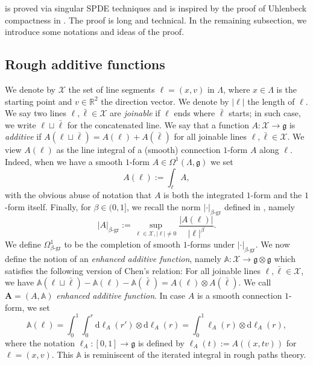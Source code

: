 \documentclass[12pt]{article}
\numberwithin{equation}{section}
\theoremstyle{definition}
\theoremstyle{remark}
\newcommand{\diff}{\mathrm{d}}
\newcommand{\R}{\mathbb R}
\newcommand{\1}{\mathbf 1}
\newcommand{\<}{\langle}
\renewcommand{\>}{\rangle}
\newcommand{\gr}{\text{-}\mathrm{gr}}
\newcommand{\bfA}{\mathbf A}
\newcommand{\bA}{\mathbb A}
\newcommand{\cX}{\mathcal X}
\newcommand{\fg}{\mathfrak g}
\begin{document}
  is proved via singular SPDE techniques and is inspired by the proof of Uhlenbeck compactness in \cite{Uhlenbeck82}. The proof is long and technical. In the remaining subsection, we introduce some notations and ideas of the proof.   
\subsection{Rough additive functions}\label{sec:RAF}

%
%
We denote by $\cX$ the set of line segments $\ell=(x,v)$ in $\Lambda$, where $x\in\Lambda$ is the starting point and $v\in\R^2$ the direction vector. We denote by $|\ell|$ the length of $\ell$. 
%
We say two lines $\ell,\bar\ell\in\cX$ are \emph{joinable} if $\ell$ ends where $\bar\ell$ starts; in such case, we write $\ell\sqcup\bar\ell$ for the concatenated line. We say that a function $A:\cX\to \fg$ is \emph{additive} if $A(\ell\sqcup\bar\ell)=A(\ell)+A(\bar\ell)$ for all joinable lines $\ell,\bar\ell\in\cX$.  
%
We view $A(\ell)$ as the line integral of a (smooth) connection $1$-form $A $ along $\ell$. Indeed, when we have a smooth $1$-form $A\in\Omega^1 (\Lambda,\fg)$ we set
\[
A(\ell):=\int_\ell A,
\]
with the obvious abuse of notation that $A$ is both the integrated $1$-form and the $1$-form itself. 
%
Finally, for $\beta\in (0,1]$, we recall the norm $|\cdot|_{\beta\gr}$ defined in \cite{CCHS2d}, namely 
\[
|A|_{\beta\gr}:=\sup_{\ell\in\cX,|\ell|\neq 0}\frac{|A(\ell)|}{|\ell|^\beta}.
\]
We define $\Omega^1_{\beta\gr}$ to be the completion of smooth $1$-forms under $|\cdot|_{\beta\gr}$.
%
We now define the notion of an \emph{enhanced additive function}, namely 
%
 $\bA:\cX\to \fg\otimes \fg$ which satisfies the following version of Chen's relation: 
%
For all joinable lines $\ell,\bar\ell\in\cX$, we have $\bA(\ell\sqcup \bar\ell)-\bA(\ell)-\bA(\bar\ell)=A(\ell)\otimes A(\bar \ell)$.
We call $\bfA=(A,\bA)$ \emph{enhanced additive function}.  In case $A$ is a smooth connection $1$-form, we set
%
$$\bA(\ell)=\int^1_0\int^r_0 \diff\ell_A(r') \otimes\diff\ell_A(r)=\int^1_0\ell_A(r)\otimes\diff\ell_A(r),$$
%
where the notation $\ell_A:[0,1]\to\fg$ is defined by $\ell_A(t):=A((x,tv))$ for $\ell=(x,v)$. This $\bA$ is reminiscent of the iterated integral in rough paths theory. 
\end{document}
